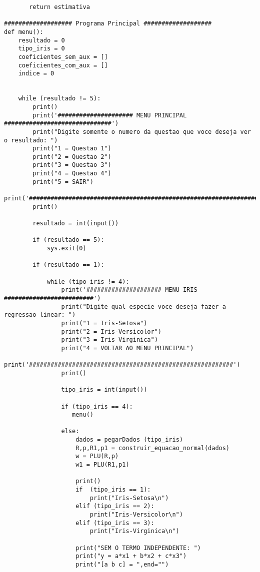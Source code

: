 \documentclass[a4paper,12pt,twoside]{article}
\begin{document}
\begin{lstlisting}
       return estimativa
    
################### Programa Principal ###################
def menu():
    resultado = 0
    tipo_iris = 0
    coeficientes_sem_aux = []
    coeficientes_com_aux = []
    indice = 0
    
    
    while (resultado != 5):    
        print()
        print('##################### MENU PRINCIPAL ##############################')
        print("Digite somente o numero da questao que voce deseja ver o resultado: ")
        print("1 = Questao 1")
        print("2 = Questao 2")
        print("3 = Questao 3")
        print("4 = Questao 4")
        print("5 = SAIR")
        print('###################################################################')
        print()
        
        resultado = int(input())
        
        if (resultado == 5):
            sys.exit(0)
    
        if (resultado == 1):
            
            while (tipo_iris != 4):
                print('##################### MENU IRIS #########################')
                print("Digite qual especie voce deseja fazer a regressao linear: ")
                print("1 = Iris-Setosa")
                print("2 = Iris-Versicolor")
                print("3 = Iris Virginica")
                print("4 = VOLTAR AO MENU PRINCIPAL")
                print('#########################################################')
                print()
             
                tipo_iris = int(input())
                
                if (tipo_iris == 4):
                   menu()
                   
                else:
                    dados = pegarDados (tipo_iris)
                    R,p,R1,p1 = construir_equacao_normal(dados)
                    w = PLU(R,p)
                    w1 = PLU(R1,p1)
                              
                    print()
                    if  (tipo_iris == 1):
                        print("Iris-Setosa\n")
                    elif (tipo_iris == 2):
                        print("Iris-Versicolor\n")
                    elif (tipo_iris == 3):
                        print("Iris-Virginica\n")
                        
                    print("SEM O TERMO INDEPENDENTE: ")
                    print("y = a*x1 + b*x2 + c*x3")
                    print("[a b c] = ",end="")
                    

\end{lstlisting}
\end{document}

